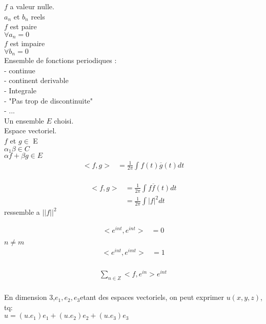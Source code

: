 \documentclass[a4paper,11pt]{article}
\begin{document}
$f$ a valeur nulle.\\
$a_n$ et $b_n$ reels\\

$f$ est paire\\
$ \forall a_n = 0$\\
$f$ est impaire\\
$\forall b_n = 0$\\

Ensemble de fonctions periodiques :\\
- continue\\
- continent derivable\\
- Integrale\\
- "Pas trop de  discontinuite"\\
- ...\\

Un ensemble $E$ choisi.\\
Espace vectoriel.\\
$f$ et $g \in $ E\\
$\alpha_1 \beta \in C$\\
$\alpha f + \beta g \in E$\\

\begin{align*}
  <f,g> &= \frac{1}{2\pi} \int f(t) \overline{g}(t) dt\\
\end{align*}

\begin{align*}
<f,g> &= \frac{1}{2\pi} \int f\overline{f}(t) dt\\
      &= \frac{1}{2\pi} \int |f|^2 dt
\end{align*}
ressemble a $||f||^2$

\begin{align*}
  <e^{int},e^{int} > &= 0\\
\end{align*}
 $n \neq m$\\
 \begin{align*}
   <e^{int},e^{imt}> &= 1\\
 \end{align*}
 
 \begin{align*}
\sum_{n \in Z} < f,e^{in}> e^{int}\\   
 \end{align*}

En dimension 3,$ e_1, e_2, e_3 $etant des espaces vectoriels, on peut exprimer $u(x,y,z)$, tq:\\
$u = (u.e_1)e_1 + (u.e_2)e_2 + (u.e_3)e_3$\\
\end{document}
